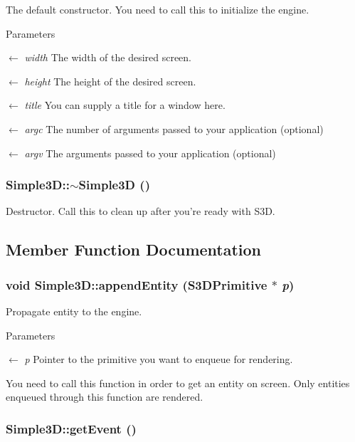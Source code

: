 The default constructor. You need to call this to initialize the engine. 


\begin{DoxyParams}{Parameters}
\item[\mbox{$\leftarrow$} {\em width}]The width of the desired screen. \item[\mbox{$\leftarrow$} {\em height}]The height of the desired screen. \item[\mbox{$\leftarrow$} {\em title}]You can supply a title for a window here. \item[\mbox{$\leftarrow$} {\em argc}]The number of arguments passed to your application (optional) \item[\mbox{$\leftarrow$} {\em argv}]The arguments passed to your application (optional) \end{DoxyParams}
\hypertarget{class_simple3_d_a859666c712fd07748e9fca5938bbfa55}{
\subsubsection[{$\sim$Simple3D}]{\setlength{\rightskip}{0pt plus 5cm}Simple3D::$\sim$Simple3D ()}}
\label{class_simple3_d_a859666c712fd07748e9fca5938bbfa55}


Destructor. Call this to clean up after you're ready with S3D. 



\subsection{Member Function Documentation}
\hypertarget{class_simple3_d_abe4d7beed767d1d24154738fad7ac1a7}{
\subsubsection[{appendEntity}]{\setlength{\rightskip}{0pt plus 5cm}void Simple3D::appendEntity ({\bf S3DPrimitive} $\ast$ {\em p})}}
\label{class_simple3_d_abe4d7beed767d1d24154738fad7ac1a7}


Propagate entity to the engine. 


\begin{DoxyParams}{Parameters}
\item[\mbox{$\leftarrow$} {\em p}]Pointer to the primitive you want to enqueue for rendering.\end{DoxyParams}
You need to call this function in order to get an entity on screen. Only entities enqueued through this function are rendered. \hypertarget{class_simple3_d_a8f6621e3e0b4bfae3011514e7fc73003}{
\subsubsection[{getEvent}]{ Simple3D::getEvent ()}}
\label{class_simple3_d_a8f6621e3e0b4bfae3011514e7fc73003}



